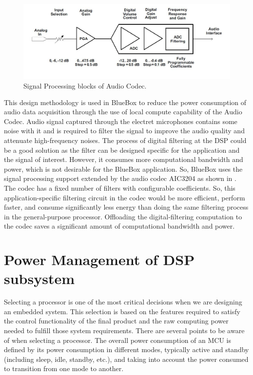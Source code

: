   \begin{figure}
 	\centering
 	\includegraphics[scale = 0.5 ]{AIC_processingBlock}
 	\caption{Signal Processing blocks of Audio Codec.  \cite{audiocodec}}
\label{AIC_processingBlock}
 \end{figure}
 
This design methodology is used in BlueBox to reduce the power
consumption of audio data acquisition through the use of local
compute capability of the Audio Codec. Audio signal captured through
the electret microphones contains some noise with it and is required
to filter the signal to improve the audio quality and attenuate
high-frequency noises. The process of digital filtering at the DSP
could be a good solution as the filter can be designed specific for
the application and the signal of interest. However, it consumes more
computational bandwidth and power, which is not desirable for the
BlueBox application. So, BlueBox uses the signal processing support
extended by the audio codec AIC3204 as shown in
. The codec has a fixed number of filters
with configurable coefficients. So, this application-specific
filtering circuit in the codec would be more efficient, perform
faster, and consume significantly less energy than doing the same
filtering process in the general-purpose processor. Offloading the
digital-filtering computation to the codec saves a significant amount
of computational bandwidth and power.
 
\section{Power Management of DSP subsystem }

Selecting a processor is one of the most critical decisions when we
are designing an embedded system. This selection is based on the
features required to satisfy the control functionality of the final
product and the raw computing power needed to fulfill those system
requirements. There are several points to be aware of when selecting
a processor. The overall power consumption of an MCU is defined by
its power consumption in different modes, typically active and
standby (including sleep, idle, standby, etc.), and taking into
account the power consumed to transition from one mode to another. 

